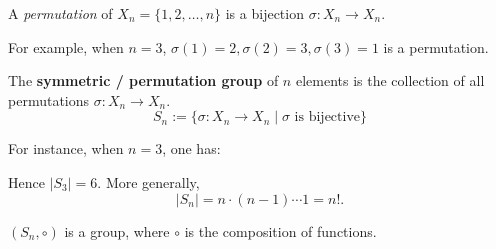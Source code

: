 \begin{definition} 
A \textit{permutation} of $X_n = \{1, 2, \dots, n\}$ is a bijection $\sigma : X_n \to X_n$. \\
\end{definition}
For example, when $n=3$, $\sigma(1)=2, \sigma(2)=3, \sigma(3)=1$ is a permutation.

\begin{definition} 
The \textbf{symmetric / permutation group} of $n$ elements is the collection of all permutations $\sigma : X_n \to X_n$.
\[ S_n := \{ \sigma : X_n \to X_n \mid \sigma \text{ is bijective} \} \]
\end{definition}
For instance, when $n = 3$, one has:
\begin{center}
\usetikzlibrary{arrows.meta, bending}
\end{center}
Hence $|S_3|=6$. More generally, 
$$|S_n| = n \cdot (n-1) \cdots 1 = n!.$$
\begin{proposition} 
$(S_n, \circ)$ is a group, where $\circ$ is the composition of functions. 
\end{proposition}
